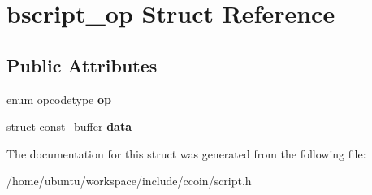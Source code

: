 \hypertarget{structbscript__op}{\section{bscript\-\_\-op Struct Reference}
\label{structbscript__op}
}
\subsection*{Public Attributes}
\begin{DoxyCompactItemize}
\item 
\hypertarget{structbscript__op_aff32c80c1f73adb52151b4ce9502b79f}{enum opcodetype {\bfseries op}}\label{structbscript__op_aff32c80c1f73adb52151b4ce9502b79f}

\item 
\hypertarget{structbscript__op_ae5f91be22dbdf64715431d1db0d4f97a}{struct \hyperlink{structconst__buffer}{const\-\_\-buffer} {\bfseries data}}\label{structbscript__op_ae5f91be22dbdf64715431d1db0d4f97a}

\end{DoxyCompactItemize}


The documentation for this struct was generated from the following file\-:\begin{DoxyCompactItemize}
\item 
/home/ubuntu/workspace/include/ccoin/script.\-h\end{DoxyCompactItemize}
